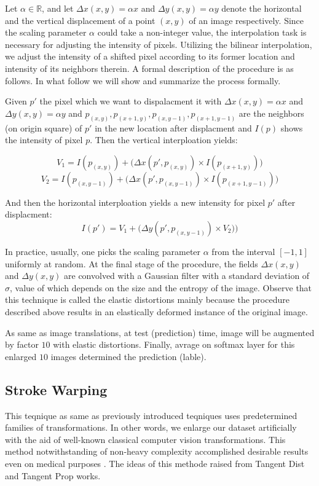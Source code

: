 Let $\alpha \in \mathbb{R}$, and let $\Delta x(x,  y) = \alpha x$ and $\Delta y(x,  y) = \alpha y$
denote the horizontal and the vertical displacement of a point $(x, y)$ of an image respectively.
Since the scaling parameter $\alpha$ could take a non-integer value, the interpolation task is
necessary for adjusting the intensity of pixels. Utilizing the bilinear interpolation, we adjust the
intensity of a shifted pixel according to its former location and intensity of its neighbors
therein. A formal description of the procedure is as follows. In what follow we will show and summarize the
process formally.

\begin{definition}{}
  Given $p'$ the pixel which we want to dispalacment it with $\Delta x(x,y)= \alpha x$ and $\Delta y(x,y)= \alpha y$ and $p_{(x,y)}, p_{(x+1,y)}, p_{(x,y-1)}, p_{(x+1,y-1)}$ are the neighbors (on
  origin square) of $p'$ in the new location after displacment and $I(p)$ shows the intensity of pixel $p$. Then the vertical interploation yields:

  $$V_1 = I(p_{(x,y)}) + \big( \Delta x(p', p_{(x,y)}) \times I(p_{(x+1,y)}) \big)$$
  $$V_2 = I(p_{(x,y-1)}) + \big( \Delta x(p', p_{(x,y-1)}) \times I(p_{(x+1,y-1)}) \big)$$

  And then the horizontal interploation yields a new intensity for pixel $p'$ after displacment:
  $$I(p') = V_1 + \big( \Delta y(p', p_{(x,y-1)}) \times V_2) \big)$$
\end{definition}

In practice, usually, one picks the scaling parameter $\alpha$ from the interval $[-1, 1]$ uniformly at random. At the final stage of the procedure, the fields  $\Delta x(x,  y)$ and $\Delta y(x,  y)$ are convolved with a Gaussian filter with a standard deviation of $\sigma$, value of which depends on the size and the entropy of the image. Observe that this technique is called the elastic distortions mainly because the procedure described above results in an elastically deformed instance of the original image.

As same as image translations, at test (prediction) time, image will be augmented by factor $10$
with elastic distortions. Finally, avrage on softmax layer for this enlarged $10$ images determined
the prediction (lable).

\subsection{Stroke Warping}
\label{tit:stroke-warping}
This teqnique as same as previously introduced teqniques uses predetermined families of transformations.
In other words, we enlarge our dataset artificially with the aid of well-known classical computer
vision transformations. This method notwithstanding of non-heavy complexity accomplished desirable
results even on medical purposes \cite{stroke_tumor}. The ideas of this methode raised from Tangent
Dist \cite{stroke_idea_1992} and Tangent Prop \cite{stroke_idea_1993} works.

